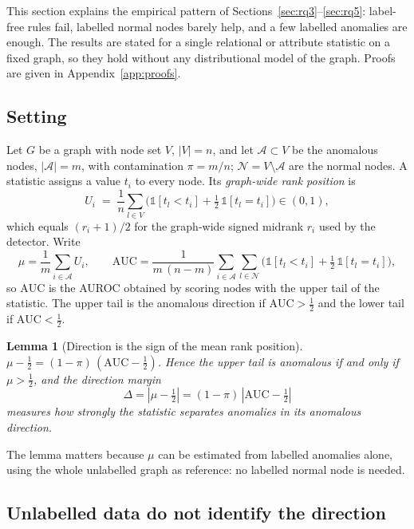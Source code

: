 \documentclass[pdflatex,sn-mathphys-ay]{sn-jnl}
\theoremstyle{plain}
\newtheorem{lemma}{Lemma}
\theoremstyle{remark}
\begin{document}
This section explains the empirical pattern of Sections~\ref{sec:rq3}--\ref{sec:rq5}: label-free rules fail, labelled normal nodes barely help, and a few labelled anomalies are enough. The results are stated for a single relational or attribute statistic on a fixed graph, so they hold without any distributional model of the graph. Proofs are given in Appendix~\ref{app:proofs}.

\subsection{Setting}

Let $G$ be a graph with node set $V$, $|V| = n$, and let $\mathcal{A} \subset V$ be the anomalous nodes, $|\mathcal{A}| = m$, with contamination $\pi = m/n$; $\mathcal{N} = V \setminus \mathcal{A}$ are the normal nodes. A statistic assigns a value $t_i$ to every node. Its \emph{graph-wide rank position} is
\begin{equation}\label{eq:rankpos}
U_i \;=\; \frac{1}{n}\sum_{l \in V}\Big(\mathbb{1}[t_l < t_i] + \tfrac12\,\mathbb{1}[t_l = t_i]\Big) \in (0,1),
\end{equation}
which equals $(r_i + 1)/2$ for the graph-wide signed midrank $r_i$ used by the detector. Write
\begin{equation}
\mu = \frac{1}{m}\sum_{i \in \mathcal{A}} U_i, \qquad
\mathrm{AUC} = \frac{1}{m\,(n-m)}\sum_{i \in \mathcal{A}}\sum_{l \in \mathcal{N}}\Big(\mathbb{1}[t_l < t_i] + \tfrac12\,\mathbb{1}[t_l = t_i]\Big),
\end{equation}
so $\mathrm{AUC}$ is the AUROC obtained by scoring nodes with the upper tail of the statistic. The upper tail is the anomalous direction if $\mathrm{AUC} > \tfrac12$ and the lower tail if $\mathrm{AUC} < \tfrac12$.

\begin{lemma}[Direction is the sign of the mean rank position]\label{lem:sign}
$\mu - \tfrac12 = (1-\pi)\,(\mathrm{AUC} - \tfrac12)$. Hence the upper tail is anomalous if and only if $\mu > \tfrac12$, and the \emph{direction margin}
\[ \Delta = |\mu - \tfrac12| = (1-\pi)\,|\mathrm{AUC} - \tfrac12| \]
measures how strongly the statistic separates anomalies in its anomalous direction.
\end{lemma}

The lemma matters because $\mu$ can be estimated from labelled anomalies alone, using the whole unlabelled graph as reference: no labelled normal node is needed.

\subsection{Unlabelled data do not identify the direction}
\end{document}
